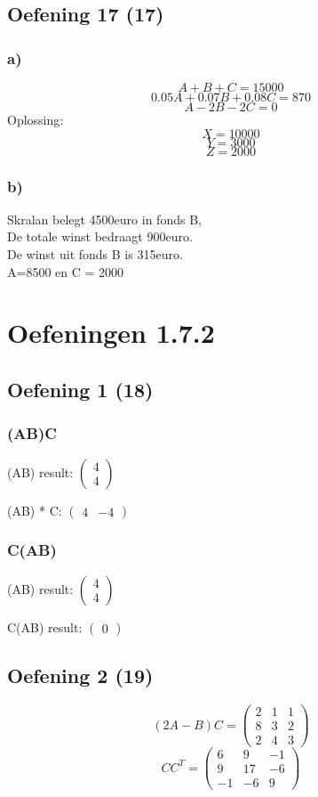 \documentclass[lineaire_algebra_oplossingen.tex]{subfiles}
\begin{document}
\subsection{Oefening 17 (17)}
\subsubsection*{a)}
\[A + B + C = 15000\]
\[0.05A + 0.07B + 0.08C = 870\]
\[A-2B-2C=0\]
Oplossing:
\[X = 10000\]
\[Y = 3000\]
\[Z = 2000\]
\subsubsection*{b)}
Skralan belegt 4500euro in fonds B, \\
De totale winst bedraagt 900euro. \\
De winst uit fonds B is 315euro. \\
A=8500 en C = 2000


\section{Oefeningen 1.7.2}
\subsection{Oefening 1 (18)}
\subsubsection*{(AB)C}
(AB) result:
$
\begin{pmatrix}

4\\
4

\end{pmatrix}
$

(AB) * C:
$
\begin{pmatrix}
4 & -4
\end{pmatrix}
$

\subsubsection*{C(AB)}
(AB) result:
$
\begin{pmatrix}
4\\
4
\end{pmatrix}
$

C(AB) result:
$
\begin{pmatrix}
0
\end{pmatrix}
$

\subsection{Oefening 2 (19)}
\[(2A-B)C = 
\begin{pmatrix}
2 &  1 &  1\\
8 &  3 &  2\\
2 &  4 &  3
\end{pmatrix}
\]
\[ CC^T =
\begin{pmatrix}
6 &  9 &  -1\\
9 &  17 &  -6\\
-1 &  -6 &  9
\end{pmatrix}
\]
\end{document}
